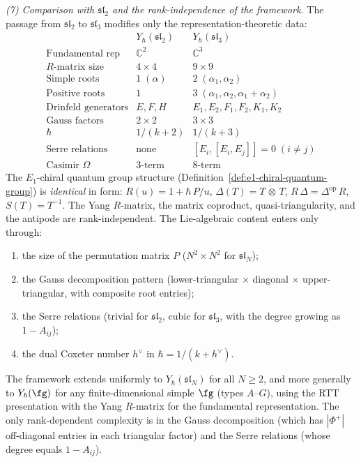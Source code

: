 \begin{example}
\medskip
\noindent\emph{(7) Comparison with $\mathfrak{sl}_2$ and the
rank-independence of the framework.}
The passage from $\mathfrak{sl}_2$ to $\mathfrak{sl}_3$
modifies only the representation-theoretic data:
\[
\renewcommand{\arraystretch}{1.15}
\begin{array}{c|c|c}
& Y_\hbar(\mathfrak{sl}_2)
& Y_\hbar(\mathfrak{sl}_3) \\
\hline
\text{Fundamental rep} & \mathbb{C}^2 & \mathbb{C}^3 \\
R\text{-matrix size} & 4\times 4 & 9\times 9 \\
\text{Simple roots} & 1\;(\alpha) & 2\;(\alpha_1,\alpha_2) \\
\text{Positive roots} & 1 & 3\;(\alpha_1,\alpha_2,\alpha_1{+}\alpha_2) \\
\text{Drinfeld generators} & E,F,H & E_1,E_2,F_1,F_2,K_1,K_2 \\
\text{Gauss factors} & 2\times 2 & 3\times 3 \\
\hbar & 1/(k{+}2) & 1/(k{+}3) \\
\text{Serre relations} & \text{none} & [E_i,[E_i,E_j]] = 0\;(i{\neq}j) \\
\text{Casimir }\Omega & 3\text{-term} & 8\text{-term}
\end{array}
\]
The $E_1$-chiral quantum group structure
(Definition~\ref{def:e1-chiral-quantum-group}) is
\emph{identical} in form: $R(u) = 1 + \hbar\,P/u$,
$\Delta(T) = T\,\dot\otimes\,T$,
$R\,\Delta = \Delta^{\mathrm{op}}\,R$,
$S(T) = T^{-1}$. The Yang $R$-matrix, the matrix
coproduct, quasi-triangularity, and the antipode
are rank-independent. The Lie-algebraic content enters
only through:
\begin{enumerate}[label=\textup{(\alph*)},nosep]
\item the size of the permutation matrix $P$
 ($N^2\times N^2$ for $\mathfrak{sl}_N$);
\item the Gauss decomposition pattern (lower-triangular
 $\times$ diagonal $\times$ upper-triangular, with composite
 root entries);
\item the Serre relations (trivial for $\mathfrak{sl}_2$,
 cubic for $\mathfrak{sl}_3$, with the degree growing as
 $1-A_{ij}$);
\item the dual Coxeter number $h^\vee$ in
 $\hbar = 1/(k{+}h^\vee)$.
\end{enumerate}
The framework extends uniformly to
$Y_\hbar(\mathfrak{sl}_N)$ for all $N\ge 2$, and more
generally to $Y_\hbar(\fg)$ for any finite-dimensional simple
$\fg$ (types $A$--$G$), using the RTT presentation with the
Yang $R$-matrix for the fundamental representation. The only
rank-dependent complexity is in the Gauss decomposition
(which has $|\Phi^+|$ off-diagonal entries in each triangular
factor) and the Serre relations (whose degree equals
$1-A_{ij}$).
\end{example}

